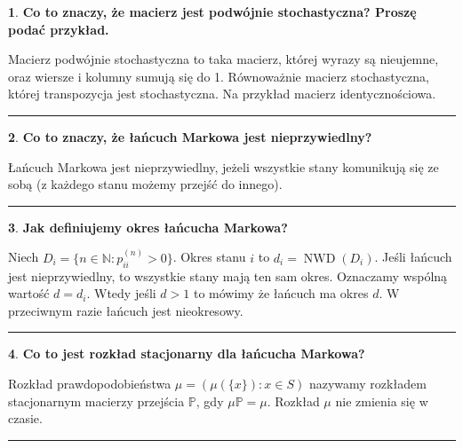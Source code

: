 \documentclass[
    twocolumn,
    twoside,
    fontsize=11pt,
    paper=A0,
    DIV=30
]{scrartcl}
\theoremstyle{definition}
\newtheorem{pytanie}{}
\theoremstyle{break}
\newenvironment{odpowiedź}{\vspace{-0.7em}}{\vspace{0.3em}\hrule}
\begin{document}
\begin{pytanie}
\textbf{Co to znaczy, że macierz jest podwójnie stochastyczna? Proszę podać przykład.}
\end{pytanie}
\begin{odpowiedź}
    Macierz podwójnie stochastyczna to taka macierz,
    której wyrazy są nieujemne, oraz
    wiersze i kolumny sumują się do 1.
    Równoważnie macierz stochastyczna,
    której transpozycja jest stochastyczna.
    Na przykład macierz identycznościowa.
\end{odpowiedź}


\begin{pytanie}
\textbf{Co to znaczy, że łańcuch Markowa jest nieprzywiedlny?}
\end{pytanie}
\begin{odpowiedź}
    Łańcuch Markowa jest nieprzywiedlny, jeżeli wszystkie
    stany komunikują się ze sobą (z każdego stanu
    możemy przejść do innego).
\end{odpowiedź}


\begin{pytanie}
\textbf{Jak definiujemy okres łańcucha Markowa?}
\end{pytanie}
\begin{odpowiedź}\label{definicja-okresu}
    Niech $D_i = \{n \in \mathbb{N}: p_{ii}^{(n)} > 0 \}$.
    Okres stanu $i$ to $d_i=\operatorname{NWD}(D_i)$.
    Jeśli łańcuch jest nieprzywiedlny, to wszystkie stany mają ten
    sam okres. Oznaczamy wspólną wartość $d = d_i$.
    Wtedy jeśli $d > 1$ to mówimy że łańcuch ma okres $d$.
    W przeciwnym razie łańcuch jest nieokresowy.
\end{odpowiedź}


\begin{pytanie}
\textbf{Co to jest rozkład stacjonarny dla łańcucha Markowa?}
\end{pytanie}
\begin{odpowiedź}
    Rozkład prawdopodobieństwa $\mu = (\mu (\{x\}) : x\in S)$
    nazywamy rozkładem stacjonarnym macierzy przejścia $\mathbb{P}$,
    gdy $\mu \mathbb{P} = \mu$.
    Rozkład $\mu$ nie zmienia się w czasie.
\end{odpowiedź}
\end{document}
